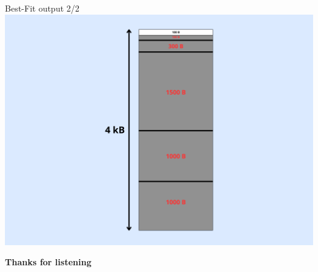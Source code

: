 \documentclass{beamer}
\begin{document}
\begin{frame}{Best-Fit output 2/2}
    \vfill
    \centering
    \includegraphics[width=0.65\linewidth]{img/best.png} 
    \vfill 
\end{frame}

\begin{frame}
    \centering
    {\Huge \textbf{Thanks for listening}}
\end{frame}
\end{document}
